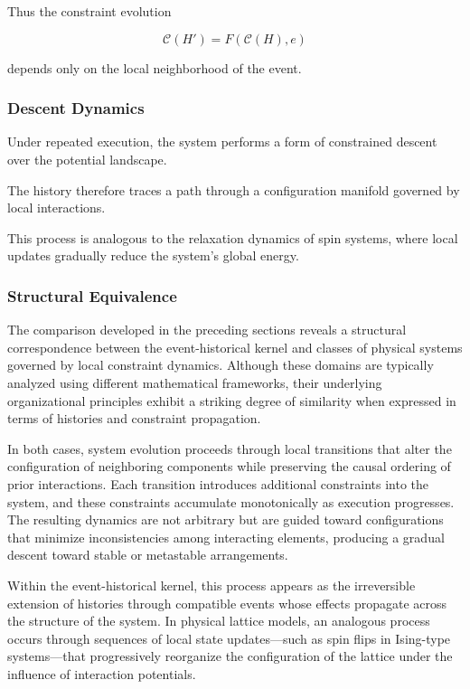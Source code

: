 \documentclass[12pt]{article}
\begin{document}
Thus the constraint evolution

\[
\mathcal{C}(H') = F(\mathcal{C}(H), e)
\]

depends only on the local neighborhood of the event.

\subsubsection{Descent Dynamics}

Under repeated execution, the system performs a form
of constrained descent over the potential landscape.

The history therefore traces a path through a
configuration manifold governed by local interactions.

This process is analogous to the relaxation dynamics
of spin systems, where local updates gradually
reduce the system's global energy.
\subsubsection{Structural Equivalence}

The comparison developed in the preceding sections
reveals a structural correspondence between the
event-historical kernel and classes of physical
systems governed by local constraint dynamics.
Although these domains are typically analyzed using
different mathematical frameworks, their underlying
organizational principles exhibit a striking degree
of similarity when expressed in terms of histories
and constraint propagation.

In both cases, system evolution proceeds through
local transitions that alter the configuration of
neighboring components while preserving the causal
ordering of prior interactions. Each transition
introduces additional constraints into the system,
and these constraints accumulate monotonically as
execution progresses. The resulting dynamics are not
arbitrary but are guided toward configurations that
minimize inconsistencies among interacting elements,
producing a gradual descent toward stable or
metastable arrangements.

Within the event-historical kernel, this process
appears as the irreversible extension of histories
through compatible events whose effects propagate
across the structure of the system. In physical
lattice models, an analogous process occurs through
sequences of local state updates—such as spin flips
in Ising-type systems—that progressively reorganize
the configuration of the lattice under the influence
of interaction potentials.
\end{document}
